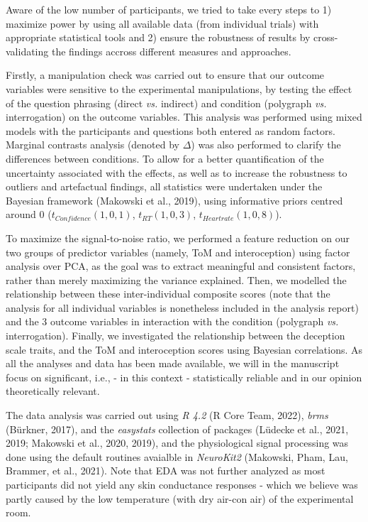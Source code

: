 \documentclass[
  man,mask,floatsintext]{apa6}
\begin{document}
Aware of the low number of participants, we tried to take every steps to 1) maximize power by using all available data (from individual trials) with appropriate statistical tools and 2) ensure the robustness of results by cross-validating the findings accross different measures and approaches.

Firstly, a manipulation check was carried out to ensure that our outcome variables were sensitive to the experimental manipulations, by testing the effect of the question phrasing (direct \emph{vs.} indirect) and condition (polygraph \emph{vs.} interrogation) on the outcome variables. This analysis was performed using mixed models with the participants and questions both entered as random factors. Marginal contrasts analysis (denoted by \(\Delta\)) was also performed to clarify the differences between conditions. To allow for a better quantification of the uncertainty associated with the effects, as well as to increase the robustness to outliers and artefactual findings, all statistics were undertaken under the Bayesian framework (Makowski et al., 2019), using informative priors centred around 0 (\(t_{Confidence}(1, 0, 1)\), \(t_{RT}(1, 0, 3)\), \(t_{Heartrate}(1, 0, 8)\)).

To maximize the signal-to-noise ratio, we performed a feature reduction on our two groups of predictor variables (namely, ToM and interoception) using factor analysis over PCA, as the goal was to extract meaningful and consistent factors, rather than merely maximizing the variance explained. Then, we modelled the relationship between these inter-individual composite scores (note that the analysis for all individual variables is nonetheless included in the analysis report) and the 3 outcome variables in interaction with the condition (polygraph \emph{vs.} interrogation). Finally, we investigated the relationship between the deception scale traits, and the ToM and interoception scores using Bayesian correlations. As all the analyses and data has been made available, we will in the manuscript focus on significant, i.e., - in this context - statistically reliable and in our opinion theoretically relevant.

The data analysis was carried out using \emph{R 4.2} (R Core Team, 2022), \emph{brms} (Bürkner, 2017), and the \emph{easystats} collection of packages (Lüdecke et al., 2021, 2019; Makowski et al., 2020, 2019), and the physiological signal processing was done using the default routines avaialble in \emph{NeuroKit2} (Makowski, Pham, Lau, Brammer, et al., 2021). Note that EDA was not further analyzed as most participants did not yield any skin conductance responses - which we believe was partly caused by the low temperature (with dry air-con air) of the experimental room.
\end{document}
